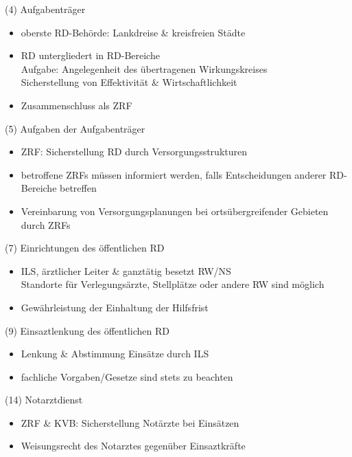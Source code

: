 \begin{sectionbox}{(4) Aufgabenträger}
    \begin{itemize}
        \item oberste RD-Behörde: Lankdreise \& kreisfreien Städte
        \item RD untergliedert in RD-Bereiche\\
        \ra Aufgabe: Angelegenheit des übertragenen Wirkungskreises\\
        \ra Sicherstellung von Effektivität \& Wirtschaftlichkeit
        \item Zusammenschluss als ZRF
    \end{itemize}
\end{sectionbox}
\begin{sectionbox}{(5) Aufgaben der Aufgabenträger}
    \begin{itemize}
        \item ZRF: Sicherstellung RD durch Versorgungsstrukturen
        \item betroffene ZRFs müssen informiert werden, falls Entscheidungen anderer RD-Bereiche betreffen
        \item Vereinbarung von Versorgungsplanungen bei ortsübergreifender Gebieten durch ZRFs
    \end{itemize}
\end{sectionbox}
\begin{sectionbox}{(7) Einrichtungen des öffentlichen RD}
    \begin{itemize}
        \item ILS, ärztlicher Leiter \& ganztätig besetzt RW/NS\\
        \ra Standorte für Verlegungsärzte, Stellplätze oder andere RW sind möglich
        \item Gewährleistung der Einhaltung der Hilfsfrist
    \end{itemize}
\end{sectionbox}
\begin{sectionbox}{(9) Einsaztlenkung des öffentlichen RD}
    \begin{itemize}
        \item Lenkung \& Abstimmung Einsätze durch ILS
        \item fachliche Vorgaben/Gesetze sind stets zu beachten
    \end{itemize}
\end{sectionbox}
\begin{sectionbox}{(14) Notarztdienst}
    \begin{itemize}
        \item ZRF \& KVB: Sicherstellung Notärzte bei Einsätzen
        \item Weisungsrecht des Notarztes gegenüber Einsaztkräfte 
    \end{itemize}
\end{sectionbox}
